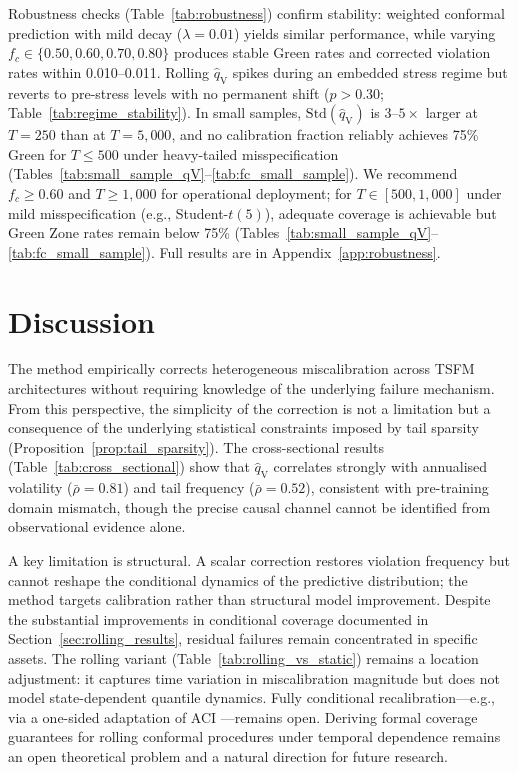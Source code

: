 \documentclass[preprint,11pt,authoryear]{elsarticle}
\newcommand{\1}{\boldsymbol{1}}
\newcommand{\qV}{\hat{q}_{\scriptscriptstyle\mathrm{V}}}
\begin{document}
	Robustness checks (Table~\ref{tab:robustness}) confirm
	stability: weighted conformal prediction with mild decay
	($\lambda = 0.01$) yields similar performance, while varying
	$f_c \in \{0.50, 0.60, 0.70, 0.80\}$ produces stable Green
	rates and corrected violation rates within 0.010--0.011.
	Rolling $\qV$ spikes during an embedded stress regime but
	reverts to pre-stress levels with no permanent shift
	($p > 0.30$; Table~\ref{tab:regime_stability}). In small
	samples, $\text{Std}(\qV)$ is $3$--$5\times$ larger at
	$T = 250$ than at $T = 5{,}000$, and no calibration fraction
	reliably achieves 75\% Green for $T \leq 500$ under
	heavy-tailed misspecification
	(Tables~\ref{tab:small_sample_qV}--\ref{tab:fc_small_sample}).
	We recommend $f_c \geq 0.60$ and $T \geq 1{,}000$ for operational
	deployment; for $T \in [500, 1{,}000]$ under mild misspecification
	(e.g., Student-$t(5)$), adequate coverage is achievable but Green
	Zone rates remain below 75\%
	(Tables~\ref{tab:small_sample_qV}--\ref{tab:fc_small_sample}).
	Full results are in Appendix~\ref{app:robustness}.
	
	
	\section{Discussion}
	\label{sec:discuss}

	The method empirically corrects heterogeneous miscalibration
	across TSFM architectures without requiring knowledge of the
	underlying failure mechanism. From this perspective, the simplicity of the correction is not a limitation but a consequence of the underlying statistical constraints imposed by tail sparsity (Proposition~\ref{prop:tail_sparsity}). The cross-sectional results
	(Table~\ref{tab:cross_sectional}) show that $\qV$ correlates
	strongly with annualised volatility ($\bar\rho = 0.81$) and
	tail frequency ($\bar\rho = 0.52$), consistent with
	pre-training domain mismatch, though the precise causal
	channel cannot be identified from observational evidence alone.
	
	A key limitation is structural. A scalar correction restores
	violation frequency but cannot reshape the conditional
	dynamics of the predictive distribution; the method targets calibration rather than structural model improvement. Despite the substantial improvements in conditional coverage documented in Section~\ref{sec:rolling_results}, residual failures remain concentrated in specific assets. The rolling variant
	(Table~\ref{tab:rolling_vs_static}) remains a location
	adjustment: it captures time variation in miscalibration magnitude but does not model state-dependent quantile dynamics. Fully conditional recalibration---e.g., via a
	one-sided adaptation of ACI \citep{gibbs2021adaptive}---remains
	open.
	Deriving formal coverage guarantees for rolling conformal procedures under temporal dependence remains an open theoretical problem and a natural direction for future research.
\end{document}
